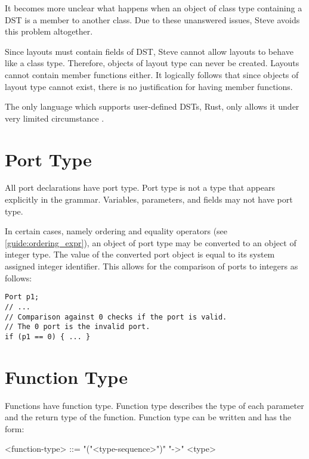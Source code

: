 It becomes more unclear what happens when an object of class type containing a DST is a member to another class. Due to these unanswered issues, Steve avoids this problem altogether. 

Since layouts must contain fields of DST, Steve cannot allow layouts to behave like a class type. Therefore, objects of layout type can never be created. Layouts cannot contain member functions either. It logically follows that since objects of layout type cannot exist, there is no justification for having member functions.

The only language which supports user-defined DSTs, Rust, only allows it under very limited circumstance \cite{rust_dst_std}.

\section{Port Type} \label{guide:port_type}

All port declarations have port type. Port type is not a type that appears explicitly in the grammar. Variables, parameters, and fields may not have port type.

In certain cases, namely ordering and equality operators (see \ref{guide:ordering_expr}), an object of port type may be converted to an object of integer type. The value of the converted port object is equal to its system assigned integer identifier. This allows for the comparison of ports to integers as follows:

\begin{minip}
\begin{lstlisting}
Port p1;
// ...
// Comparison against 0 checks if the port is valid.
// The 0 port is the invalid port.
if (p1 == 0) { ... }
\end{lstlisting}
\end{minip}

\section{Function Type} \label{guide:function_type}

Functions have function type. Function type describes the type of each parameter and the return type of the function. Function type can be written and has the form:

\begin{minip}
\begin{grammar}
<function-type> ::= "("<type-sequence>")" "->" <type>
\end{grammar}
\end{minip}

